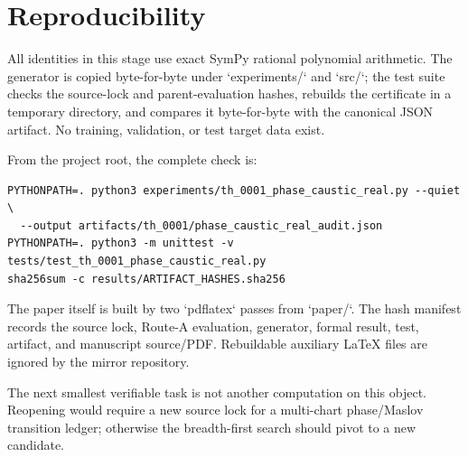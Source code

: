\section{Reproducibility}

All identities in this stage use exact SymPy rational polynomial arithmetic.
The generator is copied byte-for-byte under `experiments/` and `src/`; the
test suite checks the source-lock and parent-evaluation hashes, rebuilds the
certificate in a temporary directory, and compares it byte-for-byte with the
canonical JSON artifact.  No training, validation, or test target data exist.

From the project root, the complete check is:
\begin{verbatim}
PYTHONPATH=. python3 experiments/th_0001_phase_caustic_real.py --quiet \
  --output artifacts/th_0001/phase_caustic_real_audit.json
PYTHONPATH=. python3 -m unittest -v tests/test_th_0001_phase_caustic_real.py
sha256sum -c results/ARTIFACT_HASHES.sha256
\end{verbatim}

The paper itself is built by two `pdflatex` passes from `paper/`.  The hash
manifest records the source lock, Route-A evaluation, generator, formal
result, test, artifact, and manuscript source/PDF.  Rebuildable auxiliary
LaTeX files are ignored by the mirror repository.

The next smallest verifiable task is not another computation on this object.
Reopening would require a new source lock for a multi-chart phase/Maslov
transition ledger; otherwise the breadth-first search should pivot to a new
candidate.
